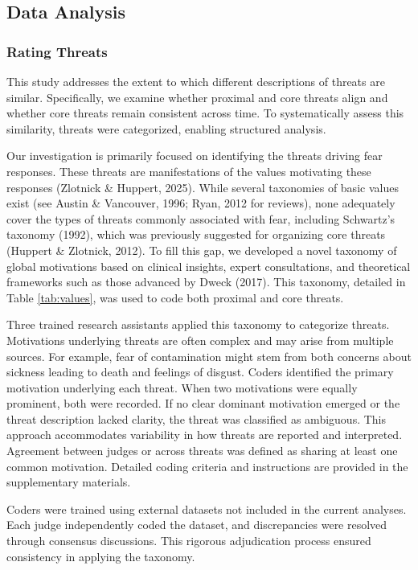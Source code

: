\documentclass[
  man,floatsintext]{apa7}
\begin{document}
\subsection{Data Analysis}\label{data-analysis}

\subsubsection{Rating Threats}\label{rating-threats}

This study addresses the extent to which different descriptions of threats are similar.
Specifically, we examine whether proximal and core threats align and whether core threats remain consistent across time.
To systematically assess this similarity, threats were categorized, enabling structured analysis.

Our investigation is primarily focused on identifying the threats driving fear responses.
These threats are manifestations of the values motivating these responses (Zlotnick \& Huppert, 2025).
While several taxonomies of basic values exist (see Austin \& Vancouver, 1996; Ryan, 2012 for reviews), none adequately cover the types of threats commonly associated with fear, including Schwartz's taxonomy (1992), which was previously suggested for organizing core threats (Huppert \& Zlotnick, 2012).
To fill this gap, we developed a novel taxonomy of global motivations based on clinical insights, expert consultations, and theoretical frameworks such as those advanced by Dweck (2017).
This taxonomy, detailed in Table \ref{tab:values}, was used to code both proximal and core threats.

Three trained research assistants applied this taxonomy to categorize threats.
Motivations underlying threats are often complex and may arise from multiple sources.
For example, fear of contamination might stem from both concerns about sickness leading to death and feelings of disgust.
Coders identified the primary motivation underlying each threat.
When two motivations were equally prominent, both were recorded.
If no clear dominant motivation emerged or the threat description lacked clarity, the threat was classified as ambiguous.
This approach accommodates variability in how threats are reported and interpreted.
Agreement between judges or across threats was defined as sharing at least one common motivation.
Detailed coding criteria and instructions are provided in the supplementary materials.

Coders were trained using external datasets not included in the current analyses.
Each judge independently coded the dataset, and discrepancies were resolved through consensus discussions.
This rigorous adjudication process ensured consistency in applying the taxonomy.
\end{document}
